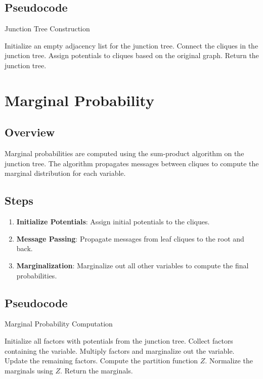 \documentclass{article}
\begin{document}
\subsection{Pseudocode}
\begin{algorithm}[H]
\caption{Junction Tree Construction}
\begin{algorithmic}[1]
\State Initialize an empty adjacency list for the junction tree.
        \State Connect the cliques in the junction tree.
    \EndIf
\EndFor
\State Assign potentials to cliques based on the original graph.
\State Return the junction tree.
\end{algorithmic}
\end{algorithm}

\section{Marginal Probability}
\subsection{Overview}
Marginal probabilities are computed using the sum-product algorithm on the junction tree. The algorithm propagates messages between cliques to compute the marginal distribution for each variable.

\subsection{Steps}
\begin{enumerate}
    \item \textbf{Initialize Potentials}: Assign initial potentials to the cliques.
    \item \textbf{Message Passing}: Propagate messages from leaf cliques to the root and back.
    \item \textbf{Marginalization}: Marginalize out all other variables to compute the final probabilities.
\end{enumerate}

\subsection{Pseudocode}
\begin{algorithm}[H]
\caption{Marginal Probability Computation}
\begin{algorithmic}[1]
\State Initialize all factors with potentials from the junction tree.
    \State Collect factors containing the variable.
    \State Multiply factors and marginalize out the variable.
    \State Update the remaining factors.
\EndFor
\State Compute the partition function \( Z \).
\State Normalize the marginals using \( Z \).
\State Return the marginals.
\end{algorithmic}
\end{algorithm}
\end{document}
